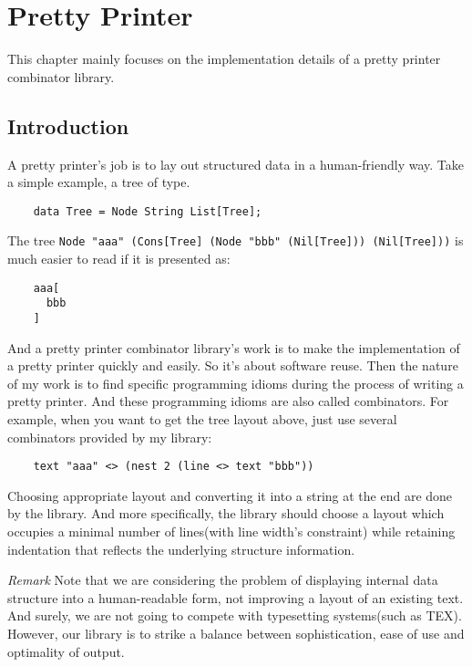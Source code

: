 \chapter{Pretty Printer}
This chapter mainly focuses on the implementation details of a pretty printer combinator library.

\section{Introduction}

A pretty printer's job is to lay out structured data in a human-friendly way. Take a simple example, a tree of type.

\begin{lstlisting}
    data Tree = Node String List[Tree];
\end{lstlisting}

The tree \texttt{Node "aaa" (Cons[Tree] (Node "bbb" (Nil[Tree])) (Nil[Tree]))} is much easier to read if it is presented as:

\begin{lstlisting}
    aaa[
      bbb
    ]
\end{lstlisting}

And a pretty printer combinator library's work is to make the implementation of a pretty printer quickly and easily. So it's about software reuse. Then the nature of my work is to find specific programming idioms during the process of writing a pretty printer. And these programming idioms are also called combinators. For example, when you want to get the tree layout above, just use several combinators provided by my library:

\begin{lstlisting}
    text "aaa" <> (nest 2 (line <> text "bbb"))
\end{lstlisting}

Choosing appropriate layout and converting it into a string at the end are done by the library. And more specifically, the library should choose a layout which occupies a minimal number of lines(with line width's constraint) while retaining indentation that reflects the underlying structure information.

\emph{Remark}
Note that we are considering the problem of displaying internal data structure into a human-readable form, not improving a layout of an existing text. And surely, we are not going to compete with typesetting systems(such as TEX). However, our library is to strike a balance between sophistication, ease of use and optimality of output.



